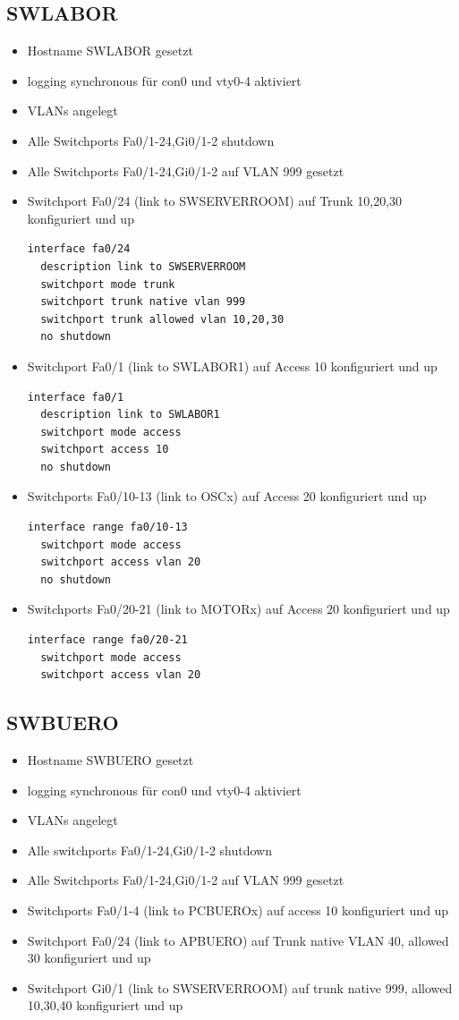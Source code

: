 \documentclass[11pt]{article}
\begin{document}
\subsection{SWLABOR}
\label{sec:org58e2240}
\begin{itemize}
\item Hostname SWLABOR gesetzt
\item logging synchronous für con0 und vty0-4 aktiviert
\item VLANs angelegt
\item Alle Switchports Fa0/1-24,Gi0/1-2 shutdown
\item Alle Switchports Fa0/1-24,Gi0/1-2 auf VLAN 999 gesetzt
\item Switchport Fa0/24 (link to SWSERVERROOM) auf Trunk 10,20,30 konfiguriert und up
\begin{verbatim}
interface fa0/24
  description link to SWSERVERROOM
  switchport mode trunk
  switchport trunk native vlan 999
  switchport trunk allowed vlan 10,20,30
  no shutdown
\end{verbatim}
\item Switchport Fa0/1 (link to SWLABOR1) auf Access 10 konfiguriert und up
\begin{verbatim}
interface fa0/1
  description link to SWLABOR1
  switchport mode access
  switchport access 10
  no shutdown
\end{verbatim}
\item Switchports Fa0/10-13 (link to OSCx) auf Access 20 konfiguriert und up
\begin{verbatim}
interface range fa0/10-13
  switchport mode access
  switchport access vlan 20
  no shutdown
\end{verbatim}
\item Switchports Fa0/20-21 (link to MOTORx) auf Access 20 konfiguriert und up
\begin{verbatim}
interface range fa0/20-21
  switchport mode access
  switchport access vlan 20
\end{verbatim}
\end{itemize}
\subsection{SWBUERO}
\label{sec:org775d4b3}
\begin{itemize}
\item Hostname SWBUERO gesetzt
\item logging synchronous für con0 und vty0-4 aktiviert
\item VLANs angelegt
\item Alle switchports Fa0/1-24,Gi0/1-2 shutdown
\item Alle Switchports Fa0/1-24,Gi0/1-2 auf VLAN 999 gesetzt
\item Switchports Fa0/1-4 (link to PCBUEROx) auf access 10 konfiguriert und up
\item Switchport Fa0/24 (link to APBUERO) auf Trunk native VLAN 40, allowed 30 konfiguriert und up
\item Switchport Gi0/1 (link to SWSERVERROOM) auf trunk native 999, allowed 10,30,40 konfiguriert und up
\end{itemize}
\end{document}
